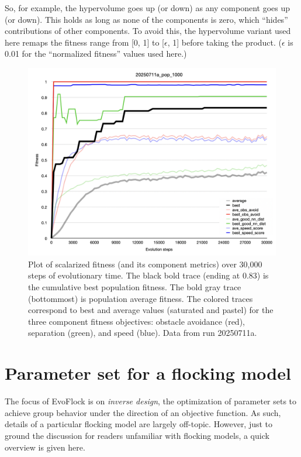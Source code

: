 \documentclass[letterpaper]{article}
\begin{document}
So, for example, the hypervolume goes up (or down) as any component goes up (or down). This holds as long as none of the components is zero, which ``hides'' contributions of other components. To avoid this, the hypervolume variant used here remaps the fitness range from [0, 1] to [$\epsilon$, 1] before taking the product. ($\epsilon$ is 0.01 for the ``normalized fitness'' values used here.)



\begin{figure}[]
    \centering
    \includegraphics[width=\linewidth]{images/temp_fit_plot.png}
    \caption{Plot of scalarized fitness (and its component metrics) over 30,000 steps of evolutionary time. The black bold trace (ending at 0.83) is the cumulative best population fitness. The bold gray trace (bottommost) is population average fitness. The colored traces correspond to best and average values (saturated and pastel) for the three component fitness objectives: obstacle avoidance (red), separation (green), and speed (blue). Data from run 20250711a.}
    \label{fig:fit_plot}
\end{figure}

\section{Parameter set for a flocking model}
\label{sec:parameter_set}

The focus of EvoFlock is on \textit{inverse design}, the optimization of parameter sets to achieve group behavior under the direction of an objective function. As such, details of a particular flocking model are largely off-topic. However, just to ground the discussion for readers unfamiliar with flocking models, a quick overview is given here.
\end{document}
